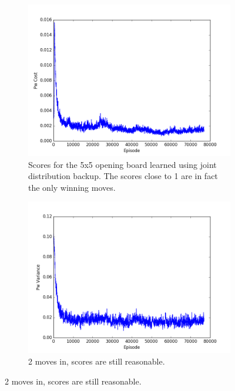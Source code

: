 \documentclass{article}
\begin{document}
\begin{figure}[!ht]
\centering
\begin{subfigure}[t]{.45\textwidth}
  \centering
      \includegraphics[width=1\textwidth]{pics/5x5_exp_Pw_cost.png}
  \caption{Scores for the 5x5 opening board learned using joint distribution backup. The scores close to 1 are in fact the only winning moves.}
  \label{fig:5x5_1}
\end{subfigure}\hfill
\begin{subfigure}[t]{.45\textwidth}
  \centering
      \includegraphics[width=1\textwidth]{pics/5x5_exp_Pw_var.png}
  \caption{2 moves in, scores are still reasonable.}
  \label{fig:5x5_2}
\end{subfigure}\vfill

\end{figure}
\end{document}
